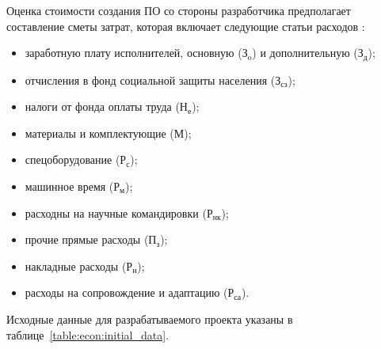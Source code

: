 Оценка стоимости создания ПО со стороны разработчика предполагает составление сметы затрат, которая включает следующие статьи расходов \cite{palycin_2006}:
\begin{itemize}

  \item заработную плату исполнителей, основную ($ \text{З}_{\text{o}} $) и дополнительную ($\text{З}_{\text{д}} $);

  \item отчисления в фонд социальной защиты населения ($ \text{З}_\text{сз} $);

  \item налоги от фонда оплаты труда ($ \text{Н}_\text{е} $);

  \item материалы и комплектующие ($ \text{М} $);

  \item спецоборудование ($ \text{Р}_\text{с} $);

  \item машинное время ($ \text{Р}_\text{м} $);

  \item расходны на научные командировки ($ \text{Р}_\text{нк} $);

  \item прочие прямые расходы ($ \text{П}_\text{з} $);

  \item накладные расходы ($ \text{Р}_\text{н} $);

  \item расходы на сопровождение и адаптацию ($ \text{Р}_\text{са} $).

\end{itemize}
Исходные данные для разрабатываемого проекта указаны в таблице~\ref{table:econ:initial_data}.

